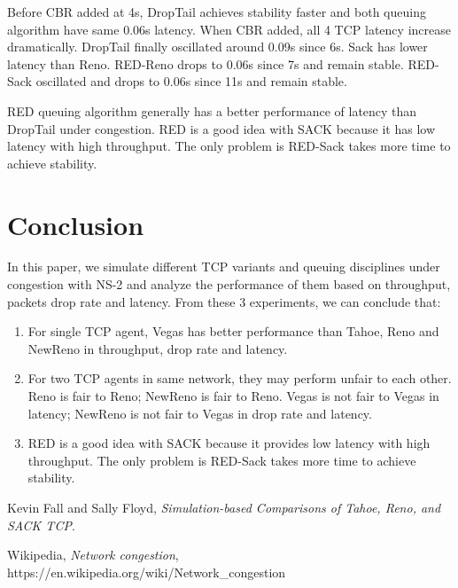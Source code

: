 \documentclass[10pt, conference]{IEEEtran}
\begin{document}
	Before CBR added at 4s, DropTail achieves stability faster and both queuing algorithm have same 0.06s latency. When CBR added, all 4 TCP latency increase dramatically. DropTail finally oscillated around 0.09s since 6s. Sack has lower latency than Reno. RED-Reno drops to 0.06s since 7s and remain stable. RED-Sack oscillated and drops to 0.06s since 11s and remain stable.
	
	RED queuing algorithm generally has a better performance of latency than DropTail under congestion. RED is a good idea with SACK because it has low latency with high throughput. The only problem is RED-Sack takes more time to achieve stability.
		
	\section{Conclusion}
	In this paper, we simulate different TCP variants and queuing disciplines under congestion with NS-2 and analyze the performance of them based on throughput, packets drop rate and latency. From these 3 experiments, 
	we can conclude that:
	\begin{enumerate}
		\item For single TCP agent, Vegas has better performance than Tahoe, Reno and NewReno in throughput, drop rate and latency.
		\item For two TCP agents in same network, they may perform unfair to each other. Reno is fair to Reno; NewReno is fair to Reno. Vegas is not fair to Vegas in latency; NewReno is not fair to Vegas in drop rate and latency.
		\item RED is a good idea with SACK because it provides low latency with high throughput. The only problem is RED-Sack takes more time to achieve stability.
	\end{enumerate}
	
	\begin{thebibliography}{1}
	Kevin Fall and Sally Floyd, \emph{Simulation-based Comparisons of Tahoe, Reno, and SACK TCP}.
	
	Wikipedia, \emph{Network congestion}, https://en.wikipedia.org/wiki/Network\_congestion
	
	\end{thebibliography}
	
	
\end{document}
